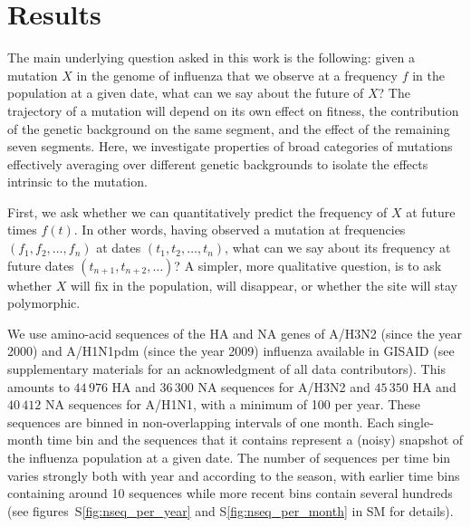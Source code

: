 \documentclass[reprint,amsmath,amssymb,superscriptaddress,showpacs,rmp]{revtex4-1}
\newcommand{\sref}[1]{S\ref{#1}}
\begin{document}


\section*{Results} %
\label{sec:results}

The main underlying question asked in this work is the following: given a mutation $X$ in the genome of influenza that we observe at a frequency $f$ in the population at a given date, what can we say about the future of $X$?
The trajectory of a mutation will depend on its own effect on fitness, the contribution of the genetic background on the same segment, and the effect of the remaining seven segments.
Here, we investigate properties of broad categories of mutations effectively averaging over different genetic backgrounds to isolate the effects intrinsic to the mutation.

First, we ask whether we can quantitatively predict the frequency of $X$ at future times $f(t)$. In other words, having observed a mutation at frequencies $(f_1, f_2,\ldots,f_n)$ at dates $(t_1,t_2,\ldots,t_n)$, what can we say about its frequency at future dates $(t_{n+1}, t_{n+2},\ldots)$?
A simpler, more qualitative question, is to ask whether $X$ will fix in the population, will disappear, or whether the site will stay polymorphic.

We use amino-acid sequences of the HA and NA genes of A/H3N2 (since the year 2000) and A/H1N1pdm (since the year 2009) influenza available in GISAID \citep{shu2017gisaid} (see supplementary materials for an acknowledgment of all data contributors).
This amounts to $44\,976$ HA and $36\,300$ NA sequences for A/H3N2 and $45\,350$ HA and $40\,412$ NA sequences for A/H1N1, with a minimum of 100 per year. These sequences are binned in non-overlapping intervals of one month. Each single-month time bin and the sequences that it contains represent a (noisy) snapshot of the influenza population at a given date. The number of sequences per time bin varies strongly both with year and according to the season, with earlier time bins containing around 10 sequences while more recent bins contain several hundreds (see figures~\sref{fig:nseq_per_year} and \sref{fig:nseq_per_month} in SM for details).
\end{document}
